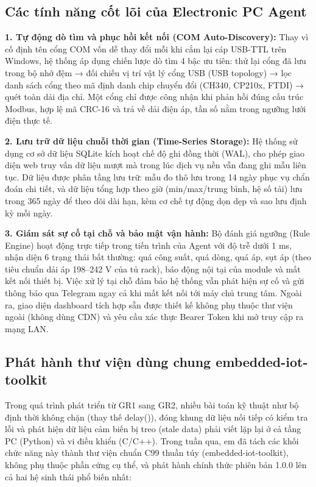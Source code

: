\documentclass[12pt,a4paper]{article}
\begin{document}
\subsection{Các tính năng cốt lõi của Electronic PC Agent}
\noindent\textbf{1. Tự động dò tìm và phục hồi kết nối (COM Auto-Discovery):} Thay vì cố định tên cổng COM vốn dễ thay đổi mỗi khi cắm lại cáp USB-TTL trên Windows, hệ thống áp dụng chiến lược dò tìm 4 bậc ưu tiên: thử lại cổng đã lưu trong bộ nhớ đệm → đối chiếu vị trí vật lý cổng USB (USB topology) → lọc danh sách cổng theo mã định danh chip chuyển đổi (CH340, CP210x, FTDI) → quét toàn dải địa chỉ. Một cổng chỉ được công nhận khi phản hồi đúng cấu trúc Modbus, hợp lệ mã CRC-16 và trả về dải điện áp, tần số nằm trong ngưỡng lưới điện thực tế.\par
\noindent\textbf{2. Lưu trữ dữ liệu chuỗi thời gian (Time-Series Storage):} Hệ thống sử dụng cơ sở dữ liệu SQLite kích hoạt chế độ ghi đồng thời (WAL), cho phép giao diện web truy vấn dữ liệu mượt mà trong lúc dịch vụ nền vẫn đang ghi mẫu liên tục. Dữ liệu được phân tầng lưu trữ: mẫu đo thô lưu trong 14 ngày phục vụ chẩn đoán chi tiết, và dữ liệu tổng hợp theo giờ (min/max/trung bình, hệ số tải) lưu trong 365 ngày để theo dõi dài hạn, kèm cơ chế tự động dọn dẹp và sao lưu định kỳ mỗi ngày.\par
\noindent\textbf{3. Giám sát sự cố tại chỗ và bảo mật vận hành:} Bộ đánh giá ngưỡng (Rule Engine) hoạt động trực tiếp trong tiến trình của Agent với độ trễ dưới 1 ms, nhận diện 6 trạng thái bất thường: quá công suất, quá dòng, quá áp, sụt áp (theo tiêu chuẩn dải áp 198–242 V của tủ rack), báo động nội tại của module và mất kết nối thiết bị. Việc xử lý tại chỗ đảm bảo hệ thống vẫn phát hiện sự cố và gửi thông báo qua Telegram ngay cả khi mất kết nối tới máy chủ trung tâm. Ngoài ra, giao diện dashboard tích hợp sẵn được thiết kế không phụ thuộc thư viện ngoài (không dùng CDN) và yêu cầu xác thực Bearer Token khi mở truy cập ra mạng LAN.\par
\subsection{Phát hành thư viện dùng chung embedded-iot-toolkit}
Trong quá trình phát triển từ GR1 sang GR2, nhiều bài toán kỹ thuật như bộ định thời không chặn (thay thế delay()), đóng khung dữ liệu nối tiếp có kiểm tra lỗi và phát hiện dữ liệu cảm biến bị treo (stale data) phải viết lặp lại ở cả tầng PC (Python) và vi điều khiển (C/C++). Trong tuần qua, em đã tách các khối chức năng này thành thư viện chuẩn C99 thuần túy (embedded-iot-toolkit), không phụ thuộc phần cứng cụ thể, và phát hành chính thức phiên bản 1.0.0 lên cả hai hệ sinh thái phổ biến nhất:
\end{document}
